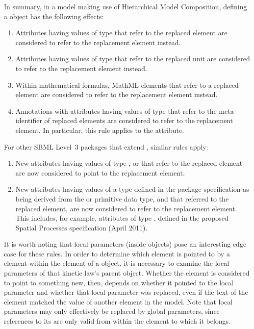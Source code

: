 In summary, in a \sbmlthreecore model making use of Hierarchical Model
Composition, defining a \ReplacedElement object has the following
effects:

\begin{enumerate}

\item Attributes having values of type  that refer to
  the replaced element are considered to refer to the replacement
  element instead.

\item Attributes having values of type  that refer
  to the replaced unit are considered to refer to the replacement
  element instead.

\item Within mathematical formulas, MathML  elements that refer
  to a replaced element are considered to refer to the replacement
  element instead.

\item Annotations with attributes having values of type 
  that refer to the meta identifier of replaced elements are considered
  to refer to the replacement element. In particular, this rule applies
  to the  attribute.

\end{enumerate}

For other SBML Level~3 packages that extend \sbmlthreecore, similar
rules apply:

\begin{enumerate}

\item New attributes having values of type ,
   or  that refer to the replaced
  element are now considered to point to the replacement element.

\item New attributes having values of a type defined in the package
  specification as being derived from the  or
   primitive data type, and that referred to the
  replaced element, are now considered to refer to the replacement
  element. This includes, for example, attributes of type
  , defined in the proposed Spatial Processes
  specification (April 2011).

\end{enumerate}

It is worth noting that local parameters (inside \Reaction objects) pose
an interesting edge case for these rules. In order to determine which
element is pointed to by a  element within the
 element of a \KineticLaw object, it is necessary to
examine the local parameters of that kinetic law's parent \Reaction
object.  Whether the  element is considered to point to
something new, then, depends on whether it pointed to the local
parameter and whether that local parameter was replaced, even if the
text of the element matched the  value of another element
in the model.  Note that local parameters may only effectively be
replaced by global parameters, since references to its 
are only valid from within the \Reaction element to which it belongs.

